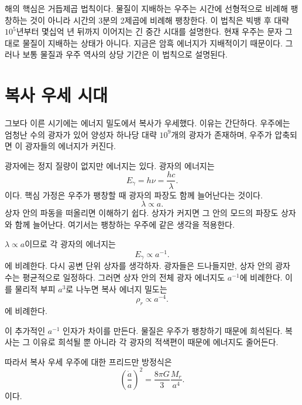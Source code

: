 해의 핵심은 거듭제곱 법칙이다. 물질이 지배하는 우주는 시간에 선형적으로 비례해 팽창하는 것이 아니라 시간의 3분의 2제곱에 비례해 팽창한다. 이 법칙은 빅뱅 후 대략 \(10^5\)년부터 몇십억 년 뒤까지 이어지는 긴 중간 시대를 설명한다. 현재 우주는 문자 그대로 물질이 지배하는 상태가 아니다. 지금은 암흑 에너지가 지배적이기 때문이다. 그러나 보통 물질과 우주 역사의 상당 기간은 이 법칙으로 설명된다.

\section{복사 우세 시대}

그보다 이른 시기에는 에너지 밀도에서 복사가 우세했다. 이유는 간단하다. 우주에는 엄청난 수의 광자가 있어 양성자 하나당 대략 \(10^9\)개의 광자가 존재하며, 우주가 압축되면 이 광자들의 에너지가 커진다.

광자에는 정지 질량이 없지만 에너지는 있다. 광자의 에너지는
\begin{equation}
E_\gamma=h\nu=\frac{hc}{\lambda}.
\end{equation}
이다. 핵심 가정은 우주가 팽창할 때 광자의 파장도 함께 늘어난다는 것이다.
\begin{equation}
\lambda\propto a.
\end{equation}
상자 안의 파동을 떠올리면 이해하기 쉽다. 상자가 커지면 그 안의 모드의 파장도 상자와 함께 늘어난다. 여기서는 팽창하는 우주에 같은 생각을 적용한다.

\(\lambda\propto a\)이므로 각 광자의 에너지는
\begin{equation}
E_\gamma\propto a^{-1}.
\end{equation}
에 비례한다. 다시 공변 단위 상자를 생각하자. 광자들은 드나들지만, 상자 안의 광자 수는 평균적으로 일정하다. 그러면 상자 안의 전체 광자 에너지도 \(a^{-1}\)에 비례한다. 이를 물리적 부피 \(a^3\)로 나누면 복사 에너지 밀도는
\begin{equation}
\rho_r\propto a^{-4}.
\end{equation}
에 비례한다.

이 추가적인 \(a^{-1}\) 인자가 차이를 만든다. 물질은 우주가 팽창하기 때문에 희석된다. 복사는 그 이유로 희석될 뿐 아니라 각 광자의 적색편이 때문에 에너지도 줄어든다.

따라서 복사 우세 우주에 대한 프리드만 방정식은
\begin{equation}
\left(\frac{\dot a}{a}\right)^2=\frac{8\pi G}{3}\frac{M_r}{a^4}.
\end{equation}
이다. 

